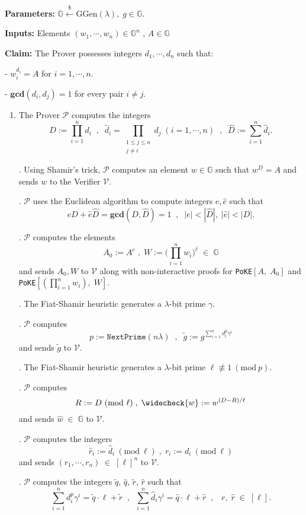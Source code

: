 \documentclass[11pt, lettersize, notitlepage, leqno, footskip=0.6cm]{article}
\newcommand{\pl}{\prod\limits}
\newcommand{\slim}{\sum\limits}
\newcommand{\ttt}{\texttt}
\newcommand{\bG}{\mathbb{G}}
\newcommand{\wti}{\widetilde}
\newcommand{\mc}{\mathcal}
\newcommand{\mb}{\mathbb}
\newcommand{\mbf}{\mathbf}
\newcommand{\mr}{\mathrm}
\newcommand{\lam}{\lambda}
\newcommand{\lamb}{\lambda}
\newcommand{\what}{\widehat}
\newcommand{\weck}{\widecheck}
\newcommand{\mP}{\mc{P}}
\newcommand{\V}{\mc{V}}
\newcommand{\vs}{\vspace{-0.15cm}}
\newcommand{\noin}{\noindent}
\newcommand{\Mod}[1]{\ (\mathrm{mod}\ #1)}
\newcommand{\GCD}{\mbf{gcd}}
\numberwithin{equation}{section}
\begin{document}
\noindent \textbf{Parameters:} $\mb{G}\xleftarrow{\$} \mr{GGen}(\lamb), \; g\in \mb{G}$.

\noindent \textbf{Inputs:} Elements $(w_1,\cdots, w_n)\in \mb{G}^n$ , $A\in\mb{G}$

\noindent \textbf{Claim:} The Prover possesses integers $ d_1,\cdots, d_n$ such that:

\noindent - $w_i^{d_i} = A$ for $i = 1,\cdots,n$.

\noindent - $\GCD(d_i, d_j) = 1$ for every pair $i\neq j$.

\begin{enumerate}[wide, labelwidth=!, labelindent=0pt]\vs \item The Prover $\mc{P}$ computes the integers \vs $$D := \prod\limits_{i=1}^n d_i\;\;,\;\;\what{d}_i = \pl_{\substack{1\leq j\leq n\\ j\neq i}} d_j\;(i=1,\cdots,n)\;\;,\;\; \what{D}:=\slim_{i=1}^n\what{d}_i.$$ \vs

\noin 2. Using Shamir's trick, $\mc{P}$ computes an element $w\in\mb{G}$ such that $w^D = A$ and sends $w$ to the Verifier $\mc{V}$.

\noin 3. $\mP$ uses the Euclidean algorithm to compute integers $e,\what{e}$ such that \vs $$eD+\what{e}\what{D} = \GCD(D,\what{D}) = 1\;\;,\;\;|e|< |\what{D}|,\;|\what{e}|< |{D}|.$$

\noin 4. $\mP$ computes the elements $$A_0:= A^{e}\;,\;W := \big(\pl_{i=1}^n w_i\big)^{\what{e}}\;\in\;\bG$$ and sends $A_0,W$ to $\V$ along with non-interactive proofs for \verb|PoKE|$[A,\; A_0]$ and \verb|PoKE|$[(\pl_{i=1}^n w_i),\; W]$.

\noin 5. The Fiat-Shamir heuristic generates a $\lam$-bit prime $\gamma$.

\noin 6. $\mc{P}$ computes \vs $$p:= \ttt{NextPrime}(n\lam)\;\;,\;\;\wti{g} := g^{\slim_{i=1}^n d_i^{p}\gamma^i}$$ and sends $\wti{g}$ to $\mc{V}$.

\noin 7. The Fiat-Shamir heuristic generates a $\lam$-bit prime $\ell\not\equiv 1\Mod{p}$.

\noin 8. $\mc{P}$ computes \vs $$R:= D\Mod{\ell}\;,\; \weck{w}:= w^{(D-R)/\ell}$$ and sends $\what{w}\;\in\;\bG$ to $\mc{V}$.

\noin 9. $\mc{P}$ computes the integers \vs $$\what{r}_i:= \what{d}_i\Mod{\ell}\;,\;{r}_i:= {d}_i\Mod{\ell}$$ and sends $(r_1,\cdots,r_n)\;\in\;[\ell]^n$ to $\mc{V}$.

\noin 10. $\mP$ computes the integers $\wti{q}$, $\what{q}$, $\wti{r}$, $\what{r}$ such that \vs $$\slim_{i=1}^n {d}_i^{p}\gamma^i = \wti{q}\cdot\ell+\wti{r}\;\;,\;\; \slim_{i=1}^n \what{d}_i\gamma^i = \what{q}\cdot\ell+\what{r}\;\;,\;\;\;r,\;\what{r}\;\in\; [\ell].$$


\end{enumerate}
\end{document}
